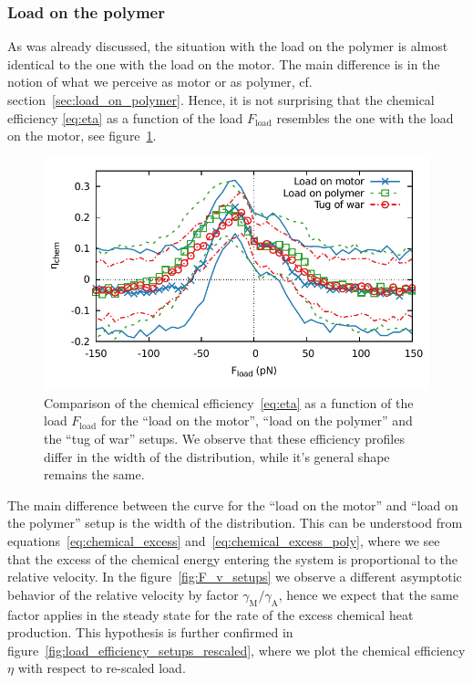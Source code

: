 \documentclass[aps,pre,twocolumn,showpacs,showkeys,superscriptaddress,floatfix]{revtex4-1}
\begin{document}
\subsubsection{Load on the polymer}
As was already discussed, the situation with the load on the polymer is almost identical to the one with the load on the motor.
The main difference is in the notion of what we perceive as motor or as polymer, cf. section~\ref{sec:load_on_polymer}.
Hence, it is not surprising that the chemical efficiency \eqref{eq:eta} as a function of the load $F_\text{load}$ 
resembles the one with the load on the motor, see figure~\ref{fig:load_efficiency_setups}. 
\begin{figure}[t]
\centering
\includegraphics[width=.45\textwidth,height=!]{F_eta_setup.pdf}
\caption{\label{fig:load_efficiency_setups}
Comparison of the chemical efficiency~\eqref{eq:eta} as a function of the load $F_\text{load}$ for the ``load on the motor'', ``load on the polymer'' and the ``tug of war'' setups.
We observe that these efficiency profiles differ in the width of the distribution, while it's general shape remains the same.   
}
\end{figure}
The main difference between the curve for the ``load on the motor'' and ``load on the polymer'' setup is the width of the distribution. 
This can be understood from equations~\eqref{eq:chemical_excess} and~\eqref{eq:chemical_excess_poly}, 
where we see that the excess of the chemical energy entering the system is proportional to the relative velocity.
In the figure~\ref{fig:F_v_setups} we observe a different asymptotic behavior of the relative velocity by factor $\gamma_\text{M} / \gamma_\text{A}$,
hence we expect that the same factor applies in the steady state for the rate of the excess chemical heat production. 
This hypothesis is further confirmed in figure~\ref{fig:load_efficiency_setups_rescaled},
where we plot the chemical efficiency $\eta$ with respect to re-scaled load. 
\end{document}
